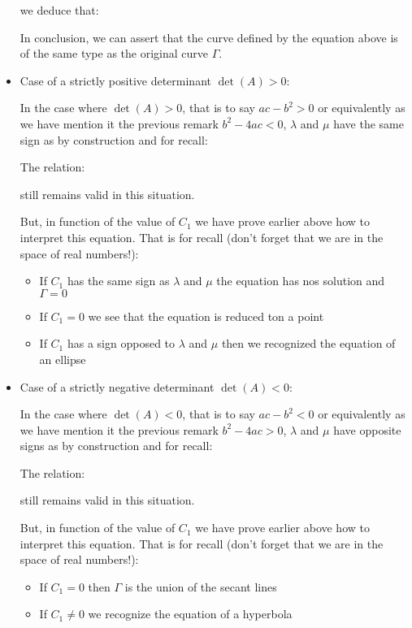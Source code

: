 \begin{itemize}
 	we deduce that:
	
	In conclusion, we can assert that the curve defined by the equation above is of the same type as the original curve $\Gamma$.

		\item Case of a strictly positive determinant $\det(A)>0$:
		
		In the case where $\det(A)>0$, that is to say $ac-b^2>0$ or equivalently as we have mention it the previous remark $b^2-4ac<0$, $\lambda$ and $\mu$ have the same sign as by construction and for recall:
		
		The relation:
		
		still remains valid in this situation.
	
		But, in function of the value of $C_1$ we have prove earlier above how to interpret this equation. That is for recall (don't forget that we are in the space of real numbers!):
		\begin{itemize}
			\item If $C_1$ has the same sign as $\lambda$ and $\mu$ the equation has nos solution and $\Gamma=0$
	
			\item If $C_1=0$ we see that the equation is reduced ton a point
	
			\item If $C_1$ has a sign opposed to $\lambda$ and $\mu$ then we recognized the equation of an ellipse
		\end{itemize}

		\item Case of a strictly negative determinant $\det(A)<0$:
		
		In the case where $\det(A)<0$, that is to say $ac-b^2<0$ or equivalently as we have mention it the previous remark $b^2-4ac>0$, $\lambda$ and $\mu$ have opposite signs as by construction and for recall:
		
		The relation:
		
		still remains valid in this situation.

		But, in function of the value of $C_1$ we have prove earlier above how to interpret this equation. That is for recall (don't forget that we are in the space of real numbers!):
		\begin{itemize}
			\item If $C_1=0$ then $\Gamma$ is the union of the secant lines
	
			\item If $C_1\neq 0$ we recognize the equation of a hyperbola
		\end{itemize}


\end{itemize}
